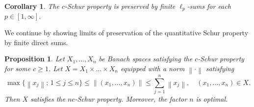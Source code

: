 \documentclass{amsart}
\numberwithin{equation}{section}
\newtheorem{prop}[thm]{Proposition}
\newtheorem{cor}[thm]{Corollary}
\theoremstyle{definition}
\newcommand{\norm}[1]{\left\|#1\right\|}
\newcommand{\setsep}{;\,}
\begin{document}
\begin{cor}\label{cor:finite}
    The $c$-Schur property is preserved by finite $\ell_p$-sums for each $p\in[1,\infty]$.
\end{cor}

We continue by showing limits of preservation of the quantitative Schur property by finite direct sums.

\begin{prop}
Let $X_1,\dots,X_n$ be Banach spaces satisfying the $c$-Schur property for some $c\ge 1$. Let $X=X_1\times\dots\times X_n$ equipped with a norm $\norm{\cdot}$ satisfying
$$\max\{\norm{x_j}\setsep 1\le j\le n\}\le \norm{(x_1,\dots,x_n)}\le \sum_{j=1}^n\norm{x_j},\quad (x_1,\dots,x_n)\in X.$$
Then $X$ satisfies the $nc$-Schur property. Moreover, the factor $n$ is optimal.   
\end{prop}
    
\end{document}
